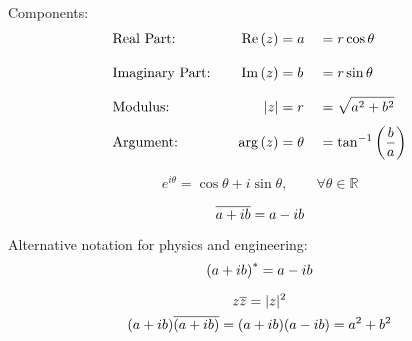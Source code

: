 \begin{multicols}{2}
\begin{CheatsheetEntryFrame}
        Components:
        \begin{alignat*}{3}
            & \text{Real Part:}            & \MyRe{(z)}  &= a      &&= r \cos{\theta} \phantom{\frac{}{a}} \\
            & \text{Imaginary Part:} \quad & \MyIm{(z)}  &= b      &&= r \sin{\theta} \phantom{\frac{b}{a}} \\
            & \text{Modulus:}              & \abs*{z}    &= r      &&= \sqrt{a^2 + b^2} \phantom{\frac{b}{a}} \\
            & \text{Argument:}             & \arg{(z)}   &= \theta &&= \tan^{-1}{\parens*{\frac{b}{a}}}
        \end{alignat*}

        \begin{equation*}
            e^{i \theta} = \cos{\theta} + i \sin{\theta}, \qquad \forall \theta \in \mathbb{R}
        \end{equation*}

    \end{CheatsheetEntryFrame}

    \begin{CheatsheetEntryFrame}

        \begin{equation*}
            \complexconjugate{a + ib} = a - ib
        \end{equation*}

        Alternative notation for physics and engineering:
        \begin{equation*}
            \parens*{a + ib}^* = a - ib
        \end{equation*}

        \begin{gather*}
            z \complexconjugate{z} = \abs*{z}^2 \\
            \parens*{a + ib} \complexconjugate{\parens*{a + ib}} = \parens*{a + ib} \parens*{a - ib} = a^2 + b^2
        \end{gather*}
        
    \end{CheatsheetEntryFrame}

    \MulticolsBreak

    \MulticolsPhantomPlaceholder

\end{multicols}

